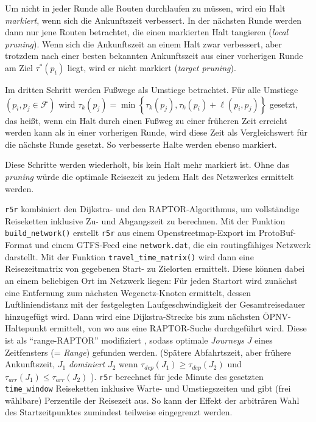 \documentclass[11pt,pdftex,a4paper]{scrartcl}
\begin{document}
	Um nicht in jeder Runde alle Routen durchlaufen zu müssen, wird ein Halt \textit{markiert}, wenn sich die Ankunftszeit verbessert. In der nächsten Runde werden dann nur jene Routen betrachtet, die einen markierten Halt tangieren (\textit{local pruning}). Wenn sich die Ankunftszeit an einem Halt zwar verbessert, aber trotzdem nach einer besten bekannten Ankunftszeit aus einer vorherigen Runde am Ziel $\tau^*(p_t)$ liegt, wird er nicht markiert (\textit{target pruning}).
	
	Im dritten Schritt werden Fußwege als Umstiege betrachtet. Für alle Umstiege $(p_i, p_j \in \mathcal{F})$ wird $\tau_k(p_j)=\min\left\{\tau_k(p_j),\tau_k(p_i) + \ell(p_i,p_j)\right\}$ gesetzt, das heißt, wenn ein Halt durch einen Fußweg zu einer früheren Zeit erreicht werden kann als in einer vorherigen Runde, wird diese Zeit als Vergleichswert für die nächste Runde gesetzt. So verbesserte Halte werden ebenso markiert.
	
	Diese Schritte werden wiederholt, bis kein Halt mehr markiert ist. Ohne das \textit{pruning} würde die optimale Reisezeit zu jedem Halt des Netzwerkes ermittelt werden.
	
	\texttt{r5r} kombiniert den Dijkstra- und den RAPTOR-Algorithmus, um vollständige Reiseketten inklusive Zu- und Abgangszeit zu berechnen. Mit der Funktion \texttt{build\_network()} erstellt \texttt{r5r} aus einem Openstreetmap-Export im ProtoBuf-Format und einem GTFS-Feed eine \texttt{network.dat}, die ein routingfähiges Netzwerk darstellt. Mit der Funktion \texttt{travel\_time\_matrix()} wird dann eine Reisezeitmatrix von gegebenen Start- zu Zielorten ermittelt. Diese können dabei an einem beliebigen Ort im Netzwerk liegen: Für jeden Startort wird zunächst eine Entfernung zum nächsten Wegenetz-Knoten ermittelt, dessen Luftliniendistanz mit der festgelegten Laufgeschwindigkeit der Gesamtreisedauer hinzugefügt wird. Dann wird eine Dijkstra-Strecke bis zum nächsten ÖPNV-Haltepunkt ermittelt, von wo aus eine RAPTOR-Suche durchgeführt wird. Diese ist als \enquote{range-RAPTOR} modifiziert \parencite[6]{conwayEvidenceBasedTransitLand2017}, sodass optimale \textit{Journeys} $J$ eines Zeitfensters (= \textit{Range}) gefunden werden. (Spätere Abfahrtszeit, aber frühere Ankunftszeit, $J_1$ \textit{dominiert} $J_2$ wenn $\tau_{dep}(J_1) \geq \tau_{dep}(J_2)$ und $\tau_{arr}(J_1) \leq \tau_{arr}(J_2)$ \parencite[6f]{dellingRoundBasedPublicTransit2012}). \texttt{r5r} berechnet für jede Minute des gesetzten \texttt{time\_window} Reiseketten inklusive Warte- und Umstiegszeiten und gibt (frei wählbare) Perzentile der Reisezeit aus. So kann der Effekt der arbiträren Wahl des Startzeitpunktes zumindest teilweise eingegrenzt werden.
	
\end{document}
